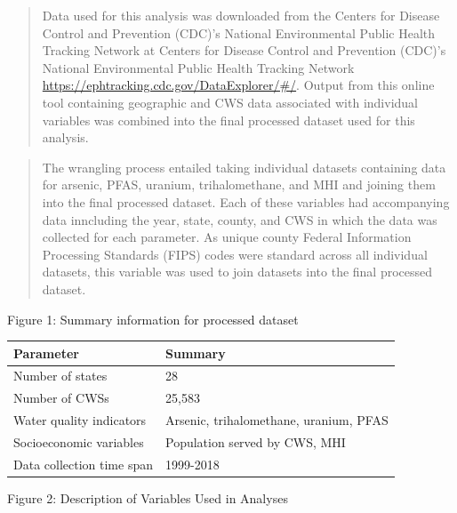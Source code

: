 \documentclass[12pt,]{article}
\begin{document}
\begin{quote}
Data used for this analysis was downloaded from the Centers for Disease
Control and Prevention (CDC)'s National Environmental Public Health
Tracking Network at Centers for Disease Control and Prevention (CDC)'s
National Environmental Public Health Tracking Network
\url{https://ephtracking.cdc.gov/DataExplorer/\#/}. Output from this
online tool containing geographic and CWS data associated with
individual variables was combined into the final processed dataset used
for this analysis.
\end{quote}

\begin{quote}
The wrangling process entailed taking individual datasets containing
data for arsenic, PFAS, uranium, trihalomethane, and MHI and joining
them into the final processed dataset. Each of these variables had
accompanying data inncluding the year, state, county, and CWS in which
the data was collected for each parameter. As unique county Federal
Information Processing Standards (FIPS) codes were standard across all
individual datasets, this variable was used to join datasets into the
final processed dataset.
\end{quote}

Figure 1: Summary information for processed dataset

\begin{longtable}[]{@{}ll@{}}
\toprule
\textbf{Parameter} & \textbf{Summary}\tabularnewline
\midrule
\endhead
Number of states & 28\tabularnewline
Number of CWSs & 25,583\tabularnewline
Water quality indicators & Arsenic, trihalomethane, uranium,
PFAS\tabularnewline
Socioeconomic variables & Population served by CWS, MHI\tabularnewline
Data collection time span & 1999-2018\tabularnewline
\bottomrule
\end{longtable}

Figure 2: Description of Variables Used in Analyses
\end{document}
